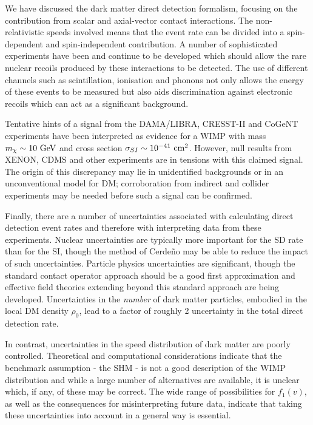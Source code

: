 We have discussed the dark matter direct detection formalism, focusing on the contribution from scalar and axial-vector contact interactions. The non-relativistic speeds involved means that the event rate can be divided into a spin-dependent and spin-independent contribution. A number of sophisticated experiments have been and continue to be developed which should allow the rare nuclear recoils produced by these interactions to be detected. The use of different channels such as scintillation, ionisation and phonons not only allows the energy of these events to be measured but also aids discrimination against electronic recoils which can act as a significant background.

Tentative hints of a signal from the DAMA/LIBRA, CRESST-II and CoGeNT experiments have been interpreted as evidence for a WIMP with mass $m_\chi \sim 10 \textrm{ GeV}$ and cross section $\sigma_{SI} \sim 10^{-41} \textrm{ cm}^2$. However, null results from XENON, CDMS and other experiments are in tensions with this claimed signal. The origin of this discrepancy may lie in unidentified backgrounds or in an unconventional model for DM; corroboration from indirect and collider experiments may be needed before such a signal can be confirmed.

Finally, there are a number of uncertainties associated with calculating direct detection event rates and therefore with interpreting data from these experiments. Nuclear uncertainties are typically more important for the SD rate than for the SI, though the method of Cerde\~{n}o \etal may be able to reduce the impact of such uncertainties. Particle physics uncertainties are significant, though the standard contact operator approach should be a good first approximation and effective field theories extending beyond this standard approach are being developed. Uncertainties in the \textit{number} of dark matter particles, embodied in the local DM density $\rho_0$, lead to a factor of roughly 2 uncertainty in the total direct detection rate.

In contrast, uncertainties in the speed distribution of dark matter are poorly controlled. Theoretical and computational considerations indicate that the benchmark assumption - the SHM - is not a good description of the WIMP distribution and while a large number of alternatives are available, it is unclear which, if any, of these may be correct. The wide range of possibilities for $f_1(v)$, as well as the consequences for misinterpreting future data, indicate that taking these uncertainties into account in a general way is essential.



